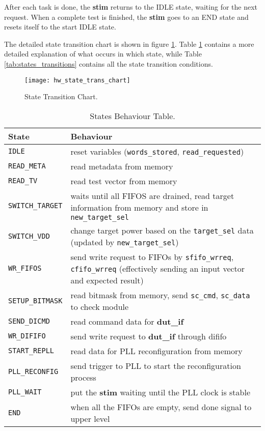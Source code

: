 After each task is done, the \textbf{stim} returns to the IDLE state, waiting for the next request. When a complete test is finished, the \textbf{stim} goes to an END state and resets itself to the start IDLE state.

The detailed state transition chart is shown in figure \ref{fig:hw_state_trans_chart}. Table \ref{tab:states_behaviour} contains a more detailed
explanation of what occurs in which state, while Table \ref{tab:states_transitions} contains all the state transition conditions.


\begin{figure}
 \centering
 \texttt{[image: hw\_state\_trans\_chart]}
 \caption{State Transition Chart.}
 \label{fig:hw_state_trans_chart}
\end{figure}

\begin{table}[ht]
\centering
\begin{tabular}{|l|p{}|}
\hline
State & Behaviour \\
\hline
\texttt{IDLE} & reset variables (\texttt{words\_stored}, \texttt{read\_requested}) \\
\texttt{READ\_META} & read metadata from memory \\
\texttt{READ\_TV} & read test vector from memory \\
\texttt{SWITCH\_TARGET} & waits until all FIFOS are drained, read target information from memory and store in \texttt{new\_target\_sel} \\
\texttt{SWITCH\_VDD} & change target power based on the \texttt{target\_sel} data (updated by \texttt{new\_target\_sel}) \\
\texttt{WR\_FIFOS} & send write request to FIFOs by \texttt{sfifo\_wrreq}, \texttt{cfifo\_wrreq} (effectively sending an input vector and expected result) \\
\texttt{SETUP\_BITMASK} & read bitmask from memory, send \texttt{sc\_cmd}, \texttt{sc\_data} to check module \\
\texttt{SEND\_DICMD} & read command data for \textbf{dut\_if} \\
\texttt{WR\_DIFIFO} & send write request to \textbf{dut\_if} through dififo \\
\texttt{START\_REPLL} & read data for PLL reconfiguration from memory \\
\texttt{PLL\_RECONFIG} & send trigger to PLL to start the reconfiguration process \\
\texttt{PLL\_WAIT} & put the \textbf{stim} waiting until the PLL clock is stable \\
\texttt{END} & when all the FIFOs are empty, send done signal to upper level \\
\hline
\end{tabular}
\caption{States Behaviour Table.}
\label{tab:states_behaviour}
\end{table}

